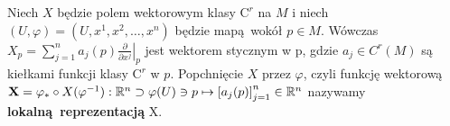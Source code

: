 %

Niech \(X\) będzie polem wektorowym klasy \(\mathrm{C}^r\) na \(M\) i niech \((U, \varphi) = (U, x^1, x^2, \dots, x^n)\) będzie mapą wokół \(p\in M\). Wówczas \(X_p = \sum_{j=1}^{n}a_j(p)\left.\frac{\partial}{\partial x^j}\right|_p\) jest wektorem stycznym w p, gdzie \(a_j\in C^r(M)\) są kiełkami funkcji klasy \(\mathrm{C}^r\) w \(p\). Popchnięcie \(X\) przez \(\varphi\), czyli funkcję wektorową \(\mathbf{X} = \varphi_{\ast}\circ X(\varphi^{-1}): \mathbb{R}^n \supset \varphi(U)\ni p \mapsto \left[a_j(p)\right]_{j=1}^n\in \mathbb{R}^n\) nazywamy \textbf{lokalną reprezentacją} X.

